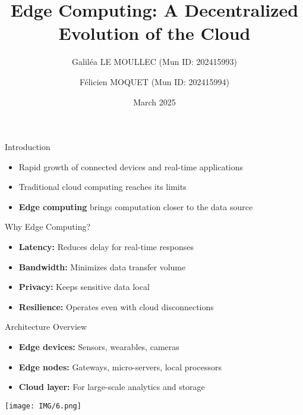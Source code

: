 \documentclass{beamer}
\title{Edge Computing: A Decentralized Evolution of the Cloud}
\author{Galiléa LE MOULLEC (Mun ID: 202415993) \and Félicien MOQUET (Mun ID: 202415994)}
\institute{Memorial University of Newfoundland, St. John's, Canada}
\date{March 2025}
\begin{document}
\begin{frame}
  \titlepage
\end{frame}

\begin{frame}{Introduction}
  \begin{itemize}
    \item Rapid growth of connected devices and real-time applications
    \item Traditional cloud computing reaches its limits
    \item \textbf{Edge computing} brings computation closer to the data source
  \end{itemize}
\end{frame}

\begin{frame}{Why Edge Computing?}
  \begin{itemize}
    \item \textbf{Latency:} Reduces delay for real-time responses
    \item \textbf{Bandwidth:} Minimizes data transfer volume
    \item \textbf{Privacy:} Keeps sensitive data local
    \item \textbf{Resilience:} Operates even with cloud disconnections
  \end{itemize}
\end{frame}

\begin{frame}{Architecture Overview}
  \begin{itemize}
    \item \textbf{Edge devices:} Sensors, wearables, cameras
    \item \textbf{Edge nodes:} Gateways, micro-servers, local processors
    \item \textbf{Cloud layer:} For large-scale analytics and storage
  \end{itemize}
  \vspace{0.5cm}
  \centering
  \texttt{[image: IMG/6.png]} %
\end{frame}
\end{document}
